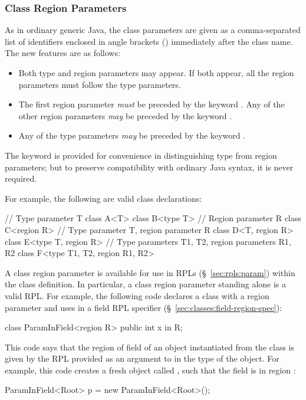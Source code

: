 \subsubsection{Class Region Parameters%
\label{sec:classes:params:class}}

 As in ordinary generic
Java, the class parameters are given as a comma-separated list of
identifiers enclosed in angle brackets (\kwd{<>}) immediately after
the class name.  The new features are as follows:
%
\begin{itemize}
%
\item Both type and region parameters may appear.  If both appear, all
  the region parameters must follow the type parameters.
%
\item The first region parameter \emph{must} be preceded by the
  keyword .  Any of the other region parameters \emph{may}
  be preceded by the keyword .
%
\item Any of the type parameters \emph{may} be preceded by the keyword
  .
%
\end{itemize}
%
The keyword  is provided for convenience in distinguishing
type from region parameters; but to preserve compatibility with
ordinary Java syntax, it is never required.

For example, the following are valid class declarations:
%
\begin{dpjlisting}
// Type parameter T
class A<T> {}            
class B<type T> {}
// Region parameter R
class C<region R> {}
// Type parameter T, region parameter R
class D<T, region R> {}
class E<type T, region R> {}
// Type parameters T1, T2, region parameters R1, R2
class F<type T1, T2, region R1, R2> {}
\end{dpjlisting}

 A class region parameter is
available for use in RPLs (\S~\ref{sec:rpls:param}) within the class
definition.  In particular, a class region parameter standing alone is
a valid RPL.  For example, the following code declares a class
 with a region parameter  and uses  in
a field RPL specifier (\S~\ref{sec:classes:field-region-spec}):
%
\begin{dpjlisting}
class ParamInField<region R> {
    public int x in R;
}
\end{dpjlisting}
%
This code says that the region of field  of an object
instantiated from the  class is given by the RPL
provided as an argument to  in the type of the object.  For
example, this code creates a fresh  object called
, such that the field  is in region :
%
\begin{dpjlisting}
ParamInField<Root> p = new ParamInField<Root>();
\end{dpjlisting}

